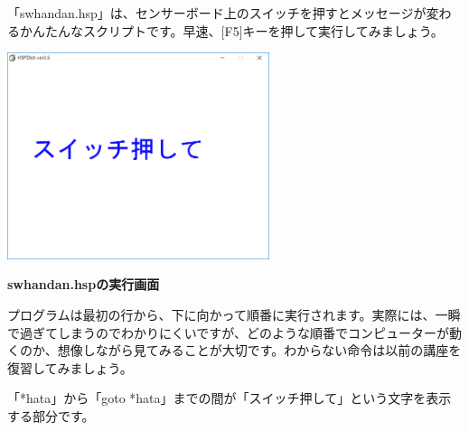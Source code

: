 \documentclass[a4paper,dvipdfmx]{jarticle}
\newcommand\textstyleqwerty[1]{#1}
\begin{document}
\bigskip


\bigskip


\bigskip


\bigskip

「swhandan.hsp」は、センサーボード上のスイッチを押すとメッセージが変わるかんたんなスクリプトです。早速、[F5]キーを押して実行してみましょう。



\begin{center}
\includegraphics[width=7.673cm,height=6.05cm]{text04-img/text04-img003.png}

\end{center}

\bigskip


\bigskip


\bigskip


\bigskip


\bigskip


\bigskip


\bigskip


\bigskip


\bigskip


\bigskip

\textstyleqwerty{\textbf{swhandan.hspの実行画面}}


\bigskip


\bigskip


\bigskip


\bigskip


\bigskip

プログラムは最初の行から、下に向かって順番に実行されます。実際には、一瞬で過ぎてしまうのでわかりにくいですが、どのような順番でコンピューターが動くのか、想像しながら見てみることが大切です。わからない命令は以前の講座を復習してみましょう。

「*hata」から「goto
*hata」までの間が「スイッチ押して」という文字を表示する部分です。


\bigskip
\end{document}
